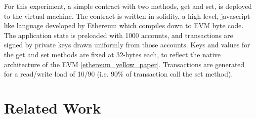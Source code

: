 For this experiment, a simple contract with two methods, get and set, is deployed to the virtual machine.
The contract is written in solidity, a high-level, javascript-like language developed by Ethereum which compiles down to EVM byte code.
The application state is preloaded with 1000 accounts, and transactions are signed by private keys drawn uniformly from those accounts.
Keys and values for the get and set methods are fixed at 32-bytes each, to reflect the native architecture of the EVM \ref{ethereum_yellow_paper}.
Transactions are generated for a read/write load of 10/90 (i.e. 90\% of transaction call the set method).

\section{Related Work}
